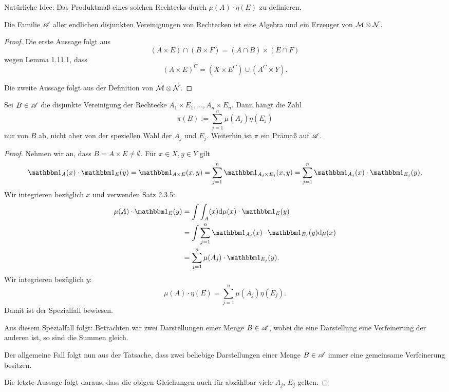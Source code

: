 Natürliche Idee: Das Produktmaß eines solchen Rechtecks durch $\mu(A) \cdot \eta(E)$ zu definieren.

\begin{lem}
 Die Familie $\mathscr{A}$ aller endlichen disjunkten Vereinigungen von Rechtecken ist eine Algebra und ein Erzeuger von $\mathcal{M} \otimes \mathcal{N}$.
\end{lem}

\begin{proof}
 Die erste Aussage folgt aus
 \[ (A \times E) \cap (B \times F) = (A \cap B) \times (E \cap F) \]
 wegen Lemma 1.11.1, dass
 \[ (A \times E)^C = (X \times E^C) \cup (A^C \times Y). \]
 
 Die zweite Aussage folgt aus der Definition von $\mathcal{M} \otimes \mathcal{N}$.
\end{proof}

\begin{lem}
 Sei $B \in \mathscr{A}$ die disjunkte Vereinigung der Rechtecke $A_1 \times E_1, \ldots, A_n \times E_n$. Dann hängt die Zahl
 \[ \pi( B ) := \sum_{j=1}^n \mu(A_j) \eta(E_j) \]
 nur von $B$ ab, nicht aber von der speziellen Wahl der $A_j$ und $E_j$. Weiterhin ist $\pi$ ein Prämaß auf $\mathscr{A}$.
\end{lem}

\begin{proof}
 Nehmen wir an, dass $B = A \times E \ne \emptyset$. Für $x \in X, y \in Y$ gilt
 \[ \ind_A(x) \cdot \ind_E(y) = \ind_{A \times E}(x,y) = \sum_{j=1}^n \ind_{A_j \times E_j} (x,y) = \sum_{j=1}^n \ind_{A_j}(x) \cdot \ind_{E_j}(y). \]
 Wir integrieren bezüglich $x$ und verwenden Satz 2.3.5:
 \[ \begin{aligned}
     \mu(A) \cdot \ind_E (y) 
     &= \int \int_A(x) \diffop \mu(x) \cdot \ind_E(y) \\
     &= \int \sum_{j=1}^n \ind_{A_j} (x) \cdot \ind_{E_j}(y) \diffop \mu(x) \\
     &= \sum_{j=1}^n \mu(A_j) \cdot \ind_{E_j} (y).
    \end{aligned} \]
 Wir integrieren bezüglich $y$:
 \[ \mu(A) \cdot \eta(E) = \sum_{j=1}^n \mu(A_j) \eta(E_j). \]
 Damit ist der Spezialfall bewiesen.
 
 Aus diesem Spezialfall folgt: Betrachten wir zwei Darstellungen einer Menge $B \in \mathscr{A}$, wobei die eine Darstellung eine Verfeinerung der anderen ist, so sind die Summen gleich.
 
 Der allgemeine Fall folgt nun aus der Tatsache, dass zwei beliebige Darstellungen einer Menge $B \in \mathscr{A}$ immer eine gemeinsame Verfeinerung besitzen.
 
 Die letzte Aussage folgt daraus, dass die obigen Gleichungen auch für abzählbar viele $A_j$, $E_j$ gelten.
\end{proof}

